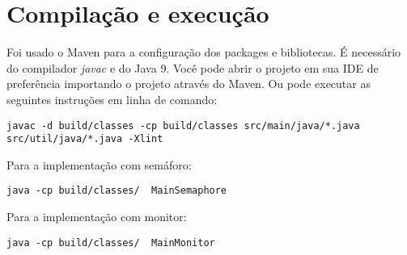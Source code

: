 \documentclass{article}
\newcommand\tab[1][1cm]{\hspace*{#1}}
\begin{document}
\section*{Compilação e execução}
\tab Foi usado o Maven para a configuração dos packages e bibliotecas. É necessário do compilador \textit{javac} e do Java 9.
Você pode abrir o projeto em sua IDE  de preferência importando o projeto através do Maven. Ou pode executar as seguintes instruções em linha de comando:
\begin{verbatim}
javac -d build/classes -cp build/classes src/main/java/*.java src/util/java/*.java -Xlint
\end{verbatim}
Para a implementação com semáforo:
\begin{verbatim}
java -cp build/classes/  MainSemaphore
\end{verbatim}
Para a implementação com monitor:
\begin{verbatim}
java -cp build/classes/  MainMonitor
\end{verbatim}
\end{document}
